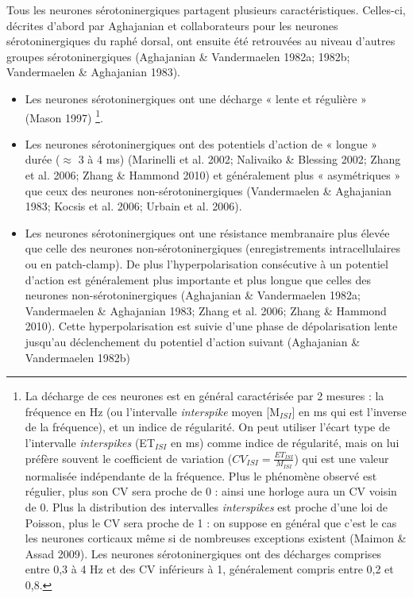 \documentclass[a4paper,12pt,twoside]{report}
\begin{document}
\bigskip

Tous les neurones sérotoninergiques partagent plusieurs caractéristiques. Celles-ci, décrites d’abord par Aghajanian et collaborateurs pour les neurones sérotoninergiques du raphé dorsal, ont ensuite été retrouvées au niveau d’autres groupes sérotoninergiques (Aghajanian \& Vandermaelen 1982a; 1982b; Vandermaelen \& Aghajanian 1983).

\begin{itemize}
\item Les neurones sérotoninergiques ont une décharge « lente et régulière » (Mason 1997)
\footnote{La décharge de ces neurones est en général caractérisée par 2 mesures : la fréquence en Hz (ou l’intervalle \textit{interspike} moyen [M$_{ISI}$] en ms qui est l’inverse de la fréquence), et un indice de régularité. On peut utiliser l’écart type de l’intervalle \textit{interspikes} (ET$_{ISI}$ en ms) comme indice de régularité, mais on lui préfère souvent le coefficient de variation ($CV_{ISI} = \frac{ET_{ISI}}{M_{ISI}}$) qui est une valeur normalisée indépendante de la fréquence. Plus le phénomène observé est régulier, plus son CV sera proche de 0 : ainsi une horloge aura un CV voisin de 0. Plus la distribution des intervalles \textit{interspikes} est proche d’une loi de Poisson, plus le CV sera proche de 1 : on suppose en général que c’est le cas les neurones corticaux même si de nombreuses exceptions existent (Maimon \& Assad 2009). Les neurones sérotoninergiques ont des décharges comprises entre 0,3 à 4 Hz et des CV inférieurs à 1, généralement compris entre 0,2 et 0,8.}.
\item Les neurones sérotoninergiques ont des potentiels d’action de « longue » durée ($\approx$ 3 à 4 ms) (Marinelli et al. 2002; Nalivaiko \& Blessing 2002; Zhang et al. 2006; Zhang \& Hammond 2010) et généralement plus « asymétriques » que ceux des neurones non-sérotoninergiques (Vandermaelen \& Aghajanian 1983; Kocsis et al. 2006; Urbain et al. 2006). 
\item Les neurones sérotoninergiques ont une résistance membranaire plus élevée que celle des neurones non-sérotoninergiques (enregistrements intracellulaires ou en patch-clamp). De plus l’hyperpolarisation consécutive à un potentiel d’action est généralement plus importante et plus longue que celles des neurones non-sérotoninergiques (Aghajanian \& Vandermaelen 1982a; Vandermaelen \& Aghajanian 1983; Zhang et al. 2006; Zhang \& Hammond 2010). Cette hyperpolarisation est suivie d’une phase de dépolarisation lente jusqu’au déclenchement du potentiel d’action suivant (Aghajanian \& Vandermaelen 1982b)

\end{itemize}
\end{document}
